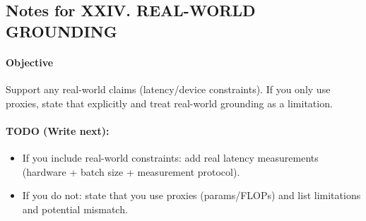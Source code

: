 \subsection*{Notes for XXIV. REAL-WORLD GROUNDING}
\paragraph{Objective}
Support any real-world claims (latency/device constraints). If you only use proxies, state that explicitly and treat real-world grounding as a limitation.

\paragraph{TODO (Write next):}
\begin{itemize}
  \item If you include real-world constraints: add real latency measurements (hardware + batch size + measurement protocol).
  \item If you do not: state that you use proxies (params/FLOPs) and list limitations and potential mismatch.
\end{itemize}
